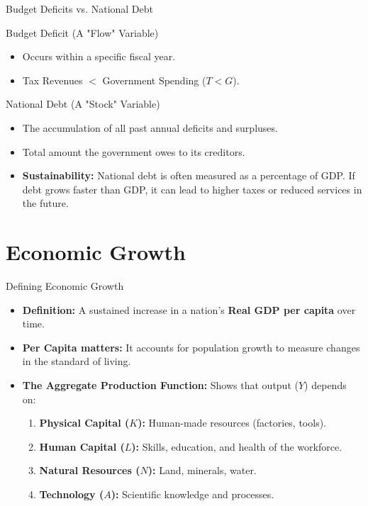 \documentclass[aspectratio=169]{beamer}
\begin{document}
\begin{frame}{Budget Deficits vs. National Debt}
    \begin{block}{Budget Deficit (A "Flow" Variable)}
        \begin{itemize}
            \item Occurs within a specific fiscal year.
            \item Tax Revenues $<$ Government Spending ($T < G$).
        \end{itemize}
    \end{block}
    
    \begin{block}{National Debt (A "Stock" Variable)}
        \begin{itemize}
            \item The accumulation of all past annual deficits and surpluses.
            \item Total amount the government owes to its creditors.
        \end{itemize}
    \end{block}
    
    \begin{itemize}
        \item \textbf{Sustainability:} National debt is often measured as a percentage of GDP. If debt grows faster than GDP, it can lead to higher taxes or reduced services in the future.
    \end{itemize}
\end{frame}

\section{Economic Growth}

\begin{frame}{Defining Economic Growth}
    \begin{itemize}
        \item \textbf{Definition:} A sustained increase in a nation's \textbf{Real GDP per capita} over time.
        \item \textbf{Per Capita matters:} It accounts for population growth to measure changes in the standard of living.
        \item \textbf{The Aggregate Production Function:} Shows that output ($Y$) depends on:
        \begin{enumerate}
            \item \textbf{Physical Capital ($K$):} Human-made resources (factories, tools).
            \item \textbf{Human Capital ($L$):} Skills, education, and health of the workforce.
            \item \textbf{Natural Resources ($N$):} Land, minerals, water.
            \item \textbf{Technology ($A$):} Scientific knowledge and processes.
        \end{enumerate}
    \end{itemize}
\end{frame}
\end{document}
